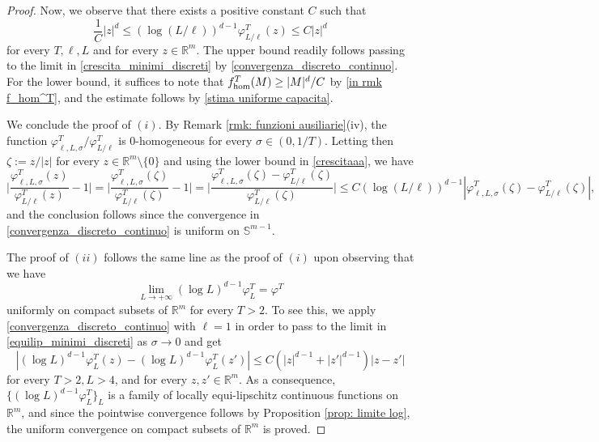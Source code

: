 \documentclass{article}
\theoremstyle{plain}
\theoremstyle{definition}
\def\rr{{\mathbb R}}
\newcommand{\f}{\varphi}
\newcommand{\s}{\sigma}
\numberwithin{equation}{section}
\begin{document}
\begin{proof}
Now, we observe that there exists a positive constant $C$ such that
    \begin{equation}
    \label{crescitaaa}
        \frac{1}{C}|z|^d\leq (\log (L/\ell))^{d-1}\f^T_{L/\ell}(z) \leq C|z|^d
    \end{equation}
    for every $T,\ell, L$ and for every $z \in \mathbb{R}^m$. The upper bound readily follows passing to the limit in \eqref{crescita_minimi_discreti} by \eqref{convergenza_discreto_continuo}. For the lower bound, it suffices to note that $f_{\rm hom}^T(M)\geq |M|^d/C$ by \eqref{in rmk f_hom^T}, and the estimate follows by \eqref{stima uniforme capacita}. 
    
    We conclude the proof of $(i)$. By Remark \ref{rmk: funzioni ausiliarie}(iv), the function $\f^T_{\ell,L,\s}/ \f^T_{L/\ell}$ is $0$-homogeneous for every $\s\in(0, 1/T)$. Letting then $\zeta:=z/|z|$ for every $z\in\rr^m\setminus\{0\}$ and using the lower bound in \eqref{crescitaaa}, we have
    \begin{equation*}
        \biggl|\frac{\f_{\ell,L,\s}^T(z)}{\f^T_{L/\ell}(z)}-1\biggr|=\biggl|\frac{\f_{\ell,L,\s}^T(\zeta)}{\f^T_{L/\ell}(\zeta)}-1\biggr|= \biggl|\frac{\f_{\ell,L,\s}^T(\zeta)-\f_{L/\ell}^T(\zeta)}{\f_{L/\ell}^T(\zeta)}\biggr|\leq C(\log (L/\ell))^{d-1}|\f_{\ell,L,\s}^T(\zeta)-\f_{L/\ell}^T(\zeta)|,
    \end{equation*}
and the conclusion follows since the convergence in \eqref{convergenza_discreto_continuo} is uniform on $\mathbb{S}^{m-1}$.
   
    The proof of $(ii)$ follows the same line as the proof of $(i)$ upon observing that we have
\begin{equation*}
   \lim_{L\to+\infty} (\log L)^{d-1}\f^T_{L} =  \f^T
\end{equation*}
uniformly on compact subsets of $\rr^m$ for every $T>2$.  To see this, we apply \eqref{convergenza_discreto_continuo} with $\ell=1$ in order to pass to the limit in \eqref{equilip_minimi_discreti} as $\s\to0$ and get
\begin{equation}
\label{equilip1}
    |(\log L)^{d-1}\f_{L}^T(z)-(\log L)^{d-1}\f_{L}^T(z')|\leq C(|z|^{d-1}+|z'|^{d-1})|z-z'|
\end{equation}
for every $T>2,L>4$, and for every $z,z'\in \rr^m$. As a consequence, $\{(\log L)^{d-1}\f^T_L\}_L$ is a family of locally equi-lipschitz continuous functions on $\rr^m$, and since the pointwise convergence follows by Proposition \ref{prop: limite log}, the uniform convergence on compact subsets of $\mathbb{R}^m$ is proved.  


\end{proof}
\end{document}
